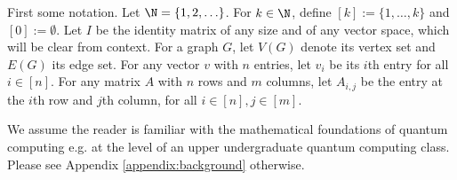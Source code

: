 First some notation. Let $\N = \{1,2,\ldots\}$. For $k \in \N$, define $[k] := \{1,\ldots,k\}$ and $[0] := \emptyset$. Let $I$ be the identity matrix of any size and of any vector space, which will be clear from context. For a graph $G$, let $V(G)$ denote its vertex set and $E(G)$ its edge set. For any vector $v$ with $n$ entries, let $v_i$ be its $i$th entry for all $i \in [n]$. For any matrix $A$ with $n$ rows and $m$ columns, let $A_{i,j}$ be the entry at the $i$th row and $j$th column, for all $i \in [n], j \in [m]$.

We assume the reader is familiar with the mathematical foundations of quantum computing e.g. at the level of an upper undergraduate quantum computing class. Please see Appendix \ref{appendix:background} otherwise.